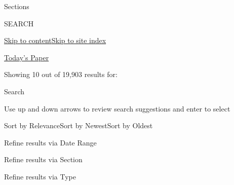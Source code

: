 Sections

SEARCH

\protect\hyperlink{site-content}{Skip to
content}\protect\hyperlink{site-index}{Skip to site index}

\href{https://myaccount.nytimes3xbfgragh.onion/auth/login?response_type=cookie\&client_id=vi}{}

\href{https://www.nytimes3xbfgragh.onion/section/todayspaper}{Today's
Paper}

Showing 10 out of 19,903 results for:

Search

Use up and down arrows to review search suggestions and enter to select

Sort by RelevanceSort by NewestSort by Oldest

Refine results via Date Range

Refine results via Section

Refine results via Type

